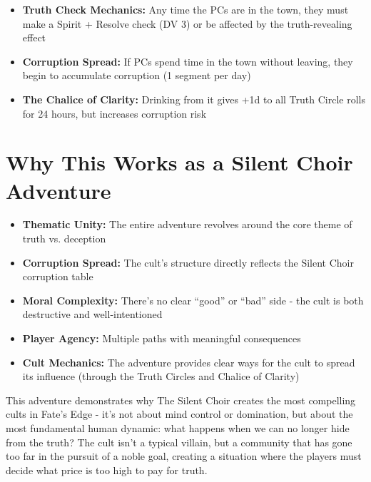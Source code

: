 \documentclass[11pt]{article}
\begin{document}
\begin{itemize}[leftmargin=*]
    \item \textbf{Truth Check Mechanics:} Any time the PCs are in the town, they must make a Spirit + Resolve check (DV 3) or be affected by the truth-revealing effect
    
    \item \textbf{Corruption Spread:} If PCs spend time in the town without leaving, they begin to accumulate corruption (1 segment per day)
    
    \item \textbf{The Chalice of Clarity:} Drinking from it gives +1d to all Truth Circle rolls for 24 hours, but increases corruption risk
\end{itemize}

\section{Why This Works as a Silent Choir Adventure}

\begin{itemize}[leftmargin=*]
    \item \textbf{Thematic Unity:} The entire adventure revolves around the core theme of truth vs. deception
    
    \item \textbf{Corruption Spread:} The cult's structure directly reflects the Silent Choir corruption table
    
    \item \textbf{Moral Complexity:} There's no clear ``good'' or ``bad'' side - the cult is both destructive and well-intentioned
    
    \item \textbf{Player Agency:} Multiple paths with meaningful consequences
    
    \item \textbf{Cult Mechanics:} The adventure provides clear ways for the cult to spread its influence (through the Truth Circles and Chalice of Clarity)
\end{itemize}

This adventure demonstrates why The Silent Choir creates the most compelling cults in Fate's Edge - it's not about mind control or domination, but about the most fundamental human dynamic: what happens when we can no longer hide from the truth? The cult isn't a typical villain, but a community that has gone too far in the pursuit of a noble goal, creating a situation where the players must decide what price is too high to pay for truth.
\end{document}
